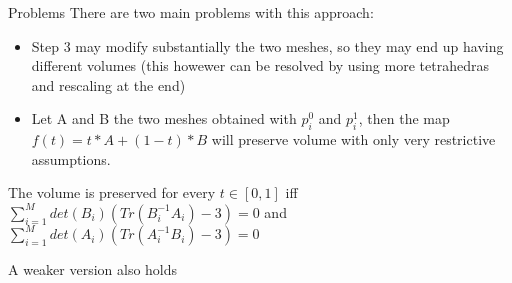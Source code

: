 \documentclass{beamer}
\begin{document}
\begin{frame}{Problems}
There are two main problems with this approach:
\begin{itemize}
\item Step 3 may modify substantially the two meshes, so they may end up having different volumes (this howewer can be resolved by using more tetrahedras and rescaling at the end)
\item Let A and B the two meshes obtained with $p_{i}^{0}$ and $p_{i}^{1}$, then the map $f(t)=t*A+(1-t)*B$ will preserve volume with only very restrictive assumptions.
\end{itemize}
\end{frame}
\begin{frame}
\begin{theorem}
The volume is preserved for every $t\in [0,1]$ iff $\sum_{i=1}^{M} det(B_{i})(Tr(B_{i}^{-1}A_{i})-3)=0$  and $\sum_{i=1}^{M} det(A_{i})(Tr(A_{i}^{-1}B_{i})-3)=0$
\end{theorem}
A weaker version also holds

\end{frame}
\end{document}
